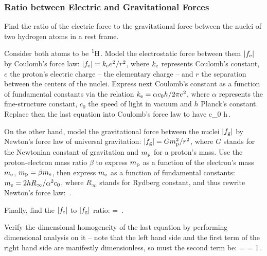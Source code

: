 \subsubsection{Ratio between Electric and Gravitational Forces}
Find the ratio of the electric force to the gravitational force between the nuclei of two hydrogen atoms in a rest frame.

\begin{solution}
Consider both atoms to be $\ce{^1 H}$. Model the electrostatic force between them $\lvert{f_\text{e}}\rvert$ by Coulomb's force law: $\lvert{f_\text{e}}\rvert = k_\text{e} e^2/r^2$, where $k_\text{e}$ represents Coulomb's constant, $e$ the proton's electric charge -- the elementary charge -- and $r$ the separation between the centers of the nuclei. Express next Coulomb's constant as a function of fundamental constants via the relation $k_\text{e} = \alpha c_0 h/2\pi e^2$, where $\alpha$ represents the fine-structure constant, $c_0$ the speed of light in vacuum and $h$ Planck's constant. Replace then the last equation into Coulomb's force law to have
\beq
{}\approx \dfrac{\alpha}{2\pi}c_0 h\,.
\eeq

On the other hand, model the gravitational force between the nuclei $\lvert{f_\text{g}}\rvert$ by Newton's force law of universal gravitation: $\lvert{f_\text{g}}\rvert = Gm_\text{p}^2/r^2$, where $G$ stands for the Newtonian constant of gravitation and $m_\text{p}$ for a proton's mass. Use the proton-electron mass ratio $\beta$ to express $m_\text{p}$ as a function of the electron's mass $m_\text{e}$, $m_\text{p} = \beta m_\text{e}$, then express $m_\text{e}$ as a function of fundamental constants: $m_\text{e} = 2hR_\infty/\alpha^2 c_0$, where $R_\infty$ stands for Rydberg constant, and thus rewrite Newton's force law:
\beq
{}\approx {}\,.
\eeq

Finally, find the $\lvert{f_\text{e}}\rvert$ to $\lvert{f_\text{g}}\rvert$ ratio:
\beq
{} = \,.\mqed
\eeq
\end{solution}

\begin{dimensional}
Verify the dimensional homogeneity of the last equation by performing dimensional analysis on it -- note that the left hand side and the first term of the right hand side are manifestly dimensionless, so must the second term be:
\beq
\dim{} = 
                                = 1\,.\mqed
\eeq
\end{dimensional}


